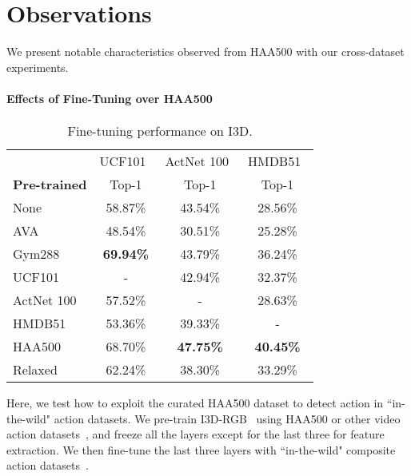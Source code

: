 \documentclass[10pt,twocolumn,letterpaper]{article}
\begin{document}
\section{Observations}
We present notable characteristics observed from HAA500 with our cross-dataset experiments.

\vspace{-1em}
\paragraph{Effects of Fine-Tuning over HAA500}
\begin{table}[t]
{\small 
\begin{center}
\begin{tabular}{l|c|c|c}
\hline
 & UCF101~\cite{ucf101} & ActNet 100~\cite{activitynet} & HMDB51~\cite{HMDB51} \\
\textbf{Pre-trained}          & Top-1            & Top-1            & Top-1 \\
\hline
None                          & 58.87\%          & 43.54\%          & 28.56\% \\ 
AVA~\cite{AVA}                & 48.54\%          & 30.51\%          & 25.28\% \\ 
Gym288~\cite{finegym}         & \textbf{69.94\%} & 43.79\%          & 36.24\% \\ 
UCF101~\cite{ucf101}          & -                & 42.94\%          & 32.37\% \\ 
ActNet 100~\cite{activitynet} & 57.52\%          & -                & 28.63\% \\
HMDB51~\cite{HMDB51}          & 53.36\%          & 39.33\%          &  -      \\
\hline
HAA500                        & 68.70\%          & \textbf{47.75\%} & \textbf{40.45\%}\\
\:\:\:Relaxed                & 62.24\%          & 38.30\%          & 33.29\%          \\ 
\hline
\end{tabular}
\end{center}}
\vspace{-0.5em}
\caption{Fine-tuning performance on I3D.}
\label{table:transfer}
\vspace{-0.8em}
\end{table}

Here, we test how to exploit the curated HAA500 dataset to detect action in ``in-the-wild" action datasets.  We pre-train I3D-RGB~\cite{i3d} using HAA500 or other video action datasets~\cite{activitynet,AVA,HMDB51,finegym,ucf101}, and freeze all the layers except for the last three for feature extraction. We then fine-tune the last three layers with ``in-the-wild" composite action datasets~\cite{activitynet,HMDB51,ucf101}.
\end{document}
